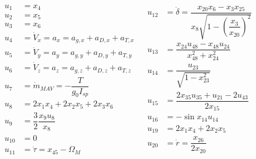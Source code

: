 \begin{align} \label{eq:unAuxEq1}
\begin{split} 
u_{1}&=x_{4}\\
u_{2}&=x_{5}\\
u_{3}&=x_{6} \\
u_{4}&=\dot{V}_{x}=a_{x}=a_{g,x}+a_{D,x}+a_{T,x}\\
u_{5}&=\dot{V}_{y}=a_{y}=a_{g,y}+a_{D,y}+a_{T,y}\\
u_{6}&=\dot{V}_{z}=a_{z}=a_{g,z}+a_{D,z}+a_{T,z}\\
u_{7} &=\dot{m}_{MAV}=-\dfrac{T}{g_{0}I_{sp}}\\
u_{8}&=2x_{1}x_{4}+2x_{2}x_{5}+2x_{3}x_{6}\\
u_{9}&=\dfrac{3}{2}\dfrac{x_{9}u_{8}}{x_{8}}\\
u_{10} &= 0 \\
u_{11} &= \dot{\tau}=x_{45}-\Omega_{M}\\
\end{split}
&
\begin{split}
u_{12} &= \dot{\delta} = \dfrac{x_{20}x_{6}-x_{3}x_{25}}{x_{8} \sqrt{1-\left(\dfrac{x_{3}}{x_{20}}\right)^{2}}}\\
u_{13} &= \dfrac{x_{24}u_{48}-x_{48}u_{24}}{x_{48}^{2}+x_{24}^{2}}\\
u_{14} &= \dfrac{u_{23}}{\sqrt{1-x_{23}^{2}}}\\
u_{15} &= \dfrac{2x_{35}u_{35}+u_{21}-2u_{43}}{2x_{15}} \\
u_{16} &= -\sin x_{14}u_{14}\\
u_{19} &= 2x_{1}x_{4}+2x_{2}x_{5}\\
u_{20} &= \dot{r} = \dfrac{x_{26}}{2 x_{20}}\\
\end{split}
\end{align}


